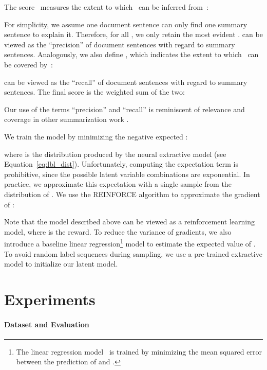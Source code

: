 \documentclass[11pt,a4paper]{article}
\begin{document}
The score~ measures the extent to which~ can be
inferred from~:

For simplicity, we assume one document sentence can only find one
summary sentence to explain it. Therefore, for all , we only
retain the most evident .  
can be viewed as the ``precision'' of document sentences with regard
to summary sentences. Analogously, we also define , which
indicates the extent to which~ can be covered
by~:

 can be viewed as the ``recall'' of
document sentences with regard to summary sentences. The final score
 is the weighted sum of the two:

Our use of the terms ``precision'' and ``recall'' is reminiscent of
relevance and coverage in other summarization work
\cite{carbonell:1998:sigir,lin:2010:naacl,see:2017:acl}.

We train the model by minimizing the negative expected :

where  is the distribution produced by the
neural extractive model (see
Equation~\eqref{eq:lbl_dist}). Unfortunately, computing the
expectation term is prohibitive, since the possible latent variable
combinations are exponential. In practice, we approximate this
expectation with a single sample from the distribution of
.  We use the REINFORCE algorithm
\cite{williams:1992:ml} to approximate the gradient of
:

Note that the model described above can be viewed as a reinforcement
learning model, where  is the reward.  To
reduce the variance of gradients, we also introduce a baseline linear
regression\footnote{The linear regression model~ is trained by
  minimizing the mean squared error between the prediction of 
  and .} model 
\cite{ranzato:2016:iclr} to estimate the expected value of
.  To avoid random label sequences during
sampling, we use a pre-trained extractive model to initialize our
latent model.



\section{Experiments}
\label{sec:exp}


\paragraph{Dataset and Evaluation}
\end{document}
